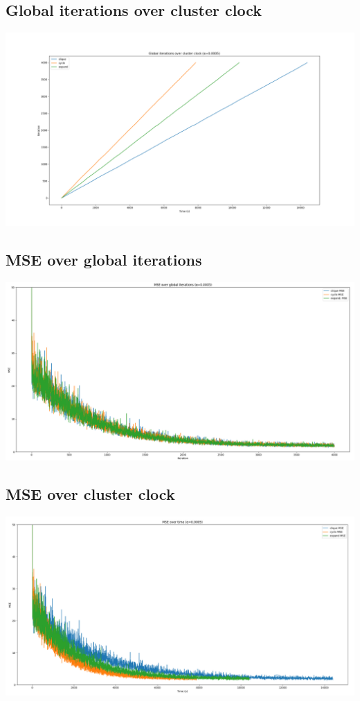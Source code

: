 \documentclass[a4paper,12pt]{article}
\theoremstyle{newplanestyle}
\theoremstyle{newdefinitionstyle}
\theoremstyle{newprovestyle}
\begin{document}
\begin{landscape}
\centering
\subsection*{Global iterations over cluster clock}
\includegraphics[scale=0.5]{iter_time_overview}

\centering
\subsection*{MSE over global iterations}
\includegraphics[scale=0.45]{mse_iter_overview}

\centering
\subsection*{MSE over cluster clock}
\includegraphics[scale=0.45]{mse_time_overview}
\end{landscape}
\end{document}
